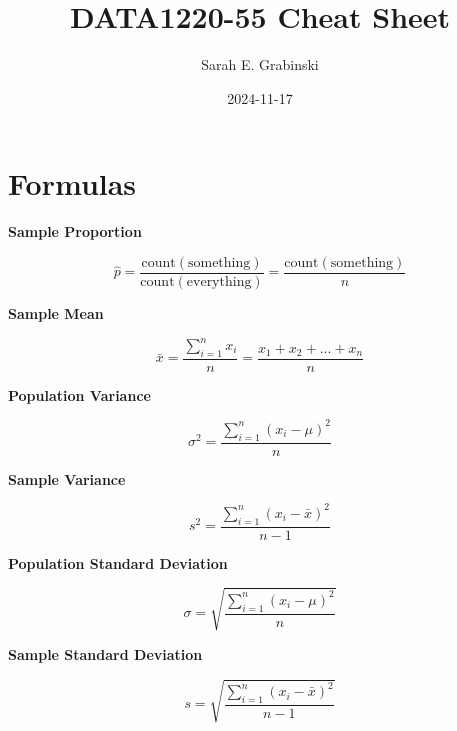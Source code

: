 \documentclass[
  letterpaper,
  DIV=11,
  numbers=noendperiod]{scrartcl}
\title{DATA1220-55 Cheat Sheet}
\author{Sarah E. Grabinski}
\date{2024-11-17}
\begin{document}
\maketitle


\section{Formulas}\label{formulas}

\begin{multicols}{2}

\begin{center}

\textbf{Sample Proportion}

$$
\hat{p} = \frac{\text{count}\left(\text{something}\right)}{\text{count}\left(\text{everything}\right)}=\frac{\text{count}\left(\text{something}\right)}{n}
$$

\end{center}

\columnbreak

\begin{center}

\textbf{Sample Mean}

$$
\bar{x}=\frac{\sum_{i=1}^n x_i}{n}=\frac{x_1+x_2+...+x_n}{n}
$$

\end{center}

\end{multicols}
\begin{multicols}{2}

\begin{center}

\textbf{Population Variance}

$$
\sigma^2=\frac{\sum_{i=1}^n (x_i-\mu)^2}{n}
$$

\end{center}

\columnbreak

\begin{center}

\textbf{Sample Variance}

$$
s^2=\frac{\sum_{i=1}^n (x_i-\bar{x})^2}{n-1}
$$

\end{center}

\end{multicols}
\begin{multicols}{2}

\begin{center}

\textbf{Population Standard Deviation}

$$
\sigma=\sqrt{\frac{\sum_{i=1}^n (x_i-\mu)^2}{n}}
$$

\end{center}

\columnbreak

\begin{center}

\textbf{Sample Standard Deviation}

$$
s=\sqrt{\frac{\sum_{i=1}^n (x_i-\bar{x})^2}{n-1}}
$$

\end{center}

\end{multicols}
\end{document}
